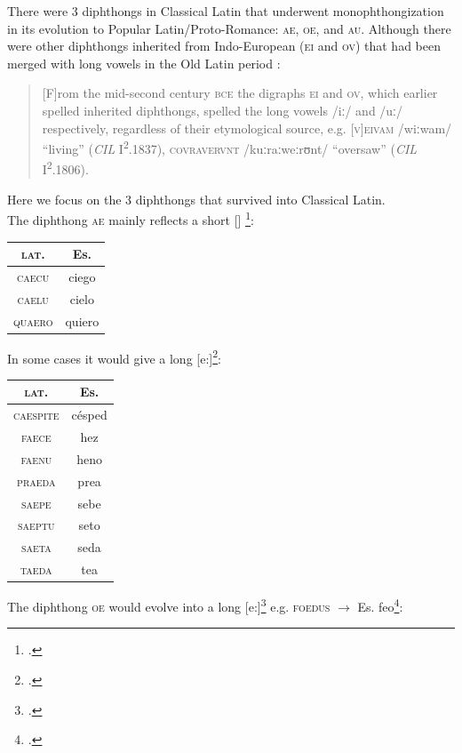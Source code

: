 \documentclass{report}[12pt]
\begin{document}
There were 3 diphthongs in Classical Latin that underwent monophthongization in its evolution to Popular Latin/Proto-Romance: \textsc{ae}, \textsc{oe}, and \textsc{au}. Although there were other diphthongs inherited from Indo-European (\textsc{ei} and \textsc{ov}) that had been merged with long vowels in the Old Latin period \parencite[p.~18]{companion_to_latin}:
\begin{quote}
  [F]rom the mid-second century \textsc{bce} the digraphs \textsc{ei} and \textsc{ov}, which earlier spelled inherited diphthongs, spelled the long vowels /iː/ and /uː/ respectively, regardless of their etymological source, e.g. \textsc{[v]eivam} /wiːwam/ ``living'' (\emph{CIL} I\textsuperscript{2}.1837), \textsc{covravervnt} /kuːraːweːrʊnt/ ``oversaw'' (\emph{CIL} I\textsuperscript{2}.1806).
\end{quote}
Here we focus on the 3 diphthongs that survived into Classical Latin. \\
The diphthong \textsc{ae} mainly reflects a short [] \footcite[p.~105]{lloyd_spanish}:
\begin{center}
  \begin{tabular}{c c}
    \textsc{lat.} & Es. \\
    \hline
    \textsc{caecu} & ciego \\
    \textsc{caelu} & cielo \\
    \textsc{quaero} & quiero \\
  \end{tabular}
\end{center}
In some cases it would give a long [e:]\footcite[p.~105]{lloyd_spanish}:
\begin{center}
  \begin{tabular}{c c}
    \textsc{lat.} & Es. \\
    \hline
    \textsc{caespite} & c\'{e}sped \\
    \textsc{faece} & hez \\
    \textsc{faenu} & heno \\
    \textsc{praeda} & prea \\
    \textsc{saepe} & sebe \\
    \textsc{saeptu} & seto \\
    \textsc{saeta} & seda \\
    \textsc{taeda} & tea \\
  \end{tabular}
\end{center}
The diphthong \textsc{oe} would evolve into a long [e:]\footcite[p.~106]{lloyd_spanish} e.g. \textsc{foedus} $\rightarrow$ Es. feo\footcite[p.~23]{romance_his}:
\end{document}
